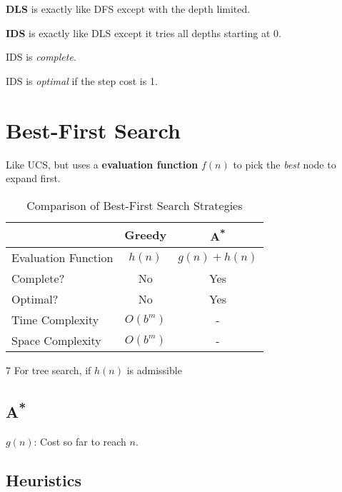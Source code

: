 \documentclass{article}
\begin{document}
    \textbf{DLS} is exactly like DFS except with the depth limited.

    \textbf{IDS} is exactly like DLS except it tries all depths starting at 0.
    
    IDS is \textit{complete}.
    
    IDS is \textit{optimal} if the step cost is 1.
    
    \section{Best-First Search}

    Like UCS, but uses a \textbf{evaluation function} $f(n)$ to pick the \textit{best} node to expand first.

    \begin{table}[h]
        \caption{Comparison of Best-First Search Strategies}
        \label{tab:informed-search-comparison}
        \centering
        \begin{threeparttable}
            \begin{tabular}{lcc}
                \toprule
                & Greedy & A\textsuperscript{*} \\
                \midrule
                Evaluation Function & $h(n)$ & $g(n) + h(n)$ \\
                Complete? & No & Yes \\
                Optimal? & No & Yes\tnote{7} \\
                Time Complexity & $O(b^m)$ & - \\
                Space Complexity & $O(b^m)$ & - \\
                \bottomrule
            \end{tabular}
            \begin{tablenotes}
                \item[7] For tree search, if $h(n)$ is admissible
            \end{tablenotes}
        \end{threeparttable}
    \end{table}

    \subsection{A\texorpdfstring{\textsuperscript{*}}{ Star}}

    $g(n)$: Cost so far to reach $n$.

    \subsection{Heuristics}
\end{document}
